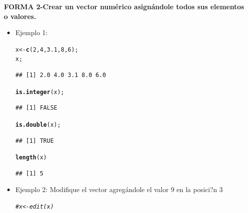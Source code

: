 \documentclass[12pt,letterpaper]{article}\usepackage[]{graphicx}\usepackage[]{color}
\makeatletter
\newcommand{\hlnum}[1]{\textcolor[rgb]{0.686,0.059,0.569}{#1}}%
\newcommand{\hlcom}[1]{\textcolor[rgb]{0.678,0.584,0.686}{\textit{#1}}}%
\newcommand{\hlstd}[1]{\textcolor[rgb]{0.345,0.345,0.345}{#1}}%
\newcommand{\hlkwb}[1]{\textcolor[rgb]{0.69,0.353,0.396}{#1}}%
\newcommand{\hlkwd}[1]{\textcolor[rgb]{0.737,0.353,0.396}{\textbf{#1}}}%
\newenvironment{kframe}{%
 \def\at@end@of@kframe{}%
 \ifinner\ifhmode%
  \def\at@end@of@kframe{\end{minipage}}%
  \begin{minipage}{\columnwidth}%
 \fi\fi%
 \def\FrameCommand##1{\hskip\@totalleftmargin \hskip-\fboxsep
 \colorbox{shadecolor}{##1}\hskip-\fboxsep
     \hskip-\linewidth \hskip-\@totalleftmargin \hskip\columnwidth}%
 \MakeFramed {\advance\hsize-\width
   \@totalleftmargin\z@ \linewidth\hsize
   \@setminipage}}%
 {\par\unskip\endMakeFramed%
 \at@end@of@kframe}
\newenvironment{knitrout}{}{} %
\makeatother
\begin{document}
\textbf{FORMA 2-Crear un vector num\'erico asign\'andole todos sus elementos o valores.}
\begin{itemize}
\item Ejemplo 1:
\begin{knitrout}
\color{fgcolor}\begin{kframe}
\begin{alltt}
\hlstd{x} \hlkwb{<-} \hlkwd{c}\hlstd{(}\hlnum{2}\hlstd{,} \hlnum{4}\hlstd{,} \hlnum{3.1}\hlstd{,} \hlnum{8}\hlstd{,} \hlnum{6}\hlstd{);}
\hlstd{x;}
\end{alltt}
\begin{verbatim}
## [1] 2.0 4.0 3.1 8.0 6.0
\end{verbatim}
\begin{alltt}
\hlkwd{is.integer}\hlstd{(x);}
\end{alltt}
\begin{verbatim}
## [1] FALSE
\end{verbatim}
\begin{alltt}
\hlkwd{is.double}\hlstd{(x);}
\end{alltt}
\begin{verbatim}
## [1] TRUE
\end{verbatim}
\begin{alltt}
\hlkwd{length}\hlstd{(x)}
\end{alltt}
\begin{verbatim}
## [1] 5
\end{verbatim}
\end{kframe}
\end{knitrout}
\item Ejemplo 2: Modifique el vector agreg\'andole el valor 9 en la posici?n 3
\begin{knitrout}
\color{fgcolor}\begin{kframe}
\begin{alltt}
\hlcom{#x <- edit(x)}
\end{alltt}
\end{kframe}
\end{knitrout}
\end{itemize}
\end{document}
